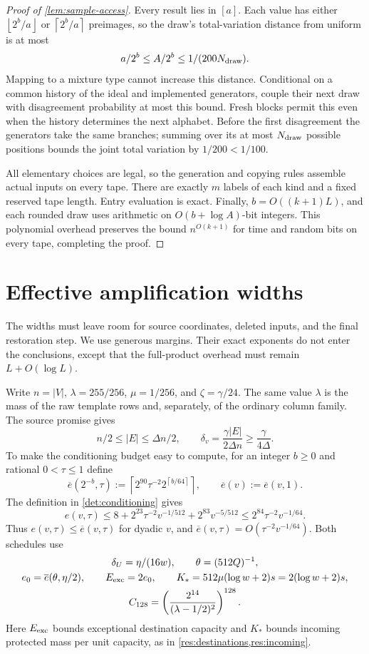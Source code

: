 \documentclass[11pt]{article} \usepackage[utf8]{inputenc}
\theoremstyle{plain} \newtheorem{theorem}{Theorem}[section]
\theoremstyle{definition} \newaliascnt{definition}{theorem}
\newcommand{\ceil}[1]{\left\lceil#1\right\rceil}
\newcommand{\floor}[1]{\left\lfloor#1\right\rfloor}
\begin{document}
\begin{proof}[Proof of \cref{lem:sample-access}]
Every result lies in $[a]$. Each value has either $\floor{2^b/a}$ or
$\ceil{2^b/a}$ preimages, so the draw's total-variation distance from uniform
is at most
\[
a/2^b\le A/2^b\le1/(200N_{\rm draw}).
\]
Mapping to a mixture type cannot increase this distance. Conditional on a
common history of the ideal and implemented generators, couple their next
draw with disagreement probability at most this bound. Fresh blocks permit
this even when the history determines the next alphabet. Before the first
disagreement the generators take the same branches; summing over its at most
$N_{\rm draw}$ possible positions bounds the joint total variation by
$1/200<1/100$.

All elementary choices are legal, so the generation and copying rules assemble
actual inputs on every tape. There are exactly $m$ labels of each kind and a
fixed reserved tape length. Entry evaluation is exact. Finally,
$b=O((k+1)L)$, and each rounded draw uses arithmetic on
$O(b+\log A)$-bit integers. This polynomial overhead preserves the bound
$n^{O(k+1)}$ for time and random bits on every tape, completing the proof.
\end{proof}

\section{Effective amplification widths}
\label{sec:parameters}

The widths must leave room for source coordinates, deleted inputs, and the
final restoration step. We use generous margins. Their exact exponents do
not enter the conclusions, except that the full-product overhead must remain
$L+O(\log L)$.

Write $n=|V|$, $\lambda=255/256$, $\mu=1/256$, and $\zeta=\gamma/24$.
The same value $\lambda$ is the mass of the raw template rows and, separately,
of the ordinary column family. The source promise gives
\[
 n/2\le |E|\le\Delta n/2,\qquad
 \delta_v=\frac{\gamma|E|}{2\Delta n}\ge\frac{\gamma}{4\Delta}.
\]
To make the conditioning budget easy to compute, for an integer $b\ge0$ and rational
$0<\tau\le1$ define
\[
\overline e(2^{-b},\tau)
 :=\ceil{2^{90}\tau^{-2}2^{\ceil{b/64}}},\qquad
\overline e(v):=\overline e(v,1).
\]
The definition in \cref{det:conditioning} gives
\[
e(v,\tau)
\le8+2^{23}\tau^{-2}v^{-1/512}+2^{83}v^{-5/512}
\le2^{84}\tau^{-2}v^{-1/64}.
\]
Thus $e(v,\tau)\le\overline e(v,\tau)$ for dyadic $v$, and
$\overline e(v,\tau)=O(\tau^{-2}v^{-1/64})$. Both schedules use
\begin{equation}\label{eq:common-budgets}
\begin{gathered}
\delta_U=\eta/(16w),\qquad \theta=(512Q)^{-1},\\
e_0=\overline e(\theta,\eta/2),\qquad E_{\rm exc}=2e_0,\qquad
K_*=512\mu(\log w+2)s=2(\log w+2)s,\\
C_{128}=\left(\frac{2^{14}}{(\lambda-1/2)^2}\right)^{128}.
\end{gathered}
\end{equation}
Here $E_{\rm exc}$ bounds exceptional destination capacity and $K_*$
bounds incoming protected mass per unit capacity, as in
\cref{res:destinations,res:incoming}.
\end{document}
